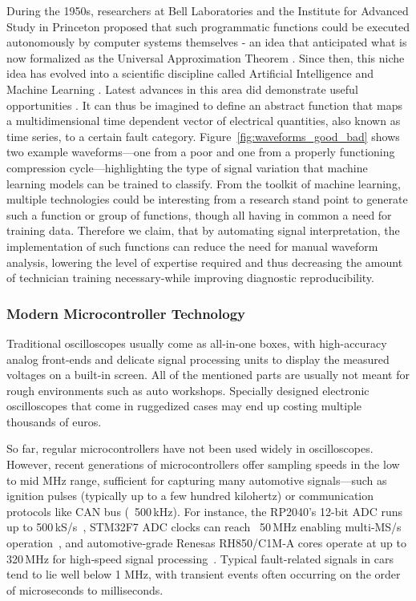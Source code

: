 During the 1950s, researchers at Bell Laboratories and the Institute for Advanced Study in Princeton proposed that such programmatic functions could be executed autonomously by computer systems themselves 
- an idea that anticipated what is now formalized as the Universal Approximation Theorem  \cite{Cybenko1989, Hornik1991}. 
Since then, this niche idea has evolved into a scientific discipline called Artificial Intelligence and Machine Learning \cite{RussellNorvig2020, Goodfellow2016}. 
Latest advances in this area did demonstrate useful opportunities \cite{LeCun2015, Silver2016}. 
It can thus be imagined to define an abstract function that maps a multidimensional time dependent vector of electrical quantities, also known as time series, to a certain fault category. 
Figure~\ref{fig:waveforms_good_bad} shows two example waveforms—one from a poor and one from a properly functioning compression cycle—highlighting the type of signal variation that machine learning models can be trained to classify.
From the toolkit of machine learning, multiple technologies could be interesting from a research stand point to generate such a function or group of functions, though all having in common a need for training data. 
Therefore we claim, that by automating signal interpretation, the implementation of such functions can reduce the need for manual waveform analysis, 
lowering the level of expertise required and thus decreasing the amount of technician training necessary-while improving diagnostic reproducibility.

\subsubsection{Modern Microcontroller Technology}
Traditional oscilloscopes usually come as all-in-one boxes, with high-accuracy analog front-ends and delicate signal processing units to display the measured voltages on a built-in screen. 
All of the mentioned parts are usually not meant for rough environments such as auto workshops. 
Specially designed electronic oscilloscopes that come in ruggedized cases may end up costing multiple thousands of euros.

So far, regular microcontrollers have not been used widely in oscilloscopes. 
However, recent generations of microcontrollers offer sampling speeds in the low to mid MHz range, 
sufficient for capturing many automotive signals—such as ignition pulses (typically up to a few hundred kilohertz) or communication protocols like CAN bus (~500 kHz). 
For instance, the RP2040’s 12-bit ADC runs up to 500 kS/s~\cite{rp2040_ds}, STM32F7 ADC clocks can reach ~50 MHz enabling multi‑MS/s operation~\cite{stm32f7_ds}, 
and automotive‑grade Renesas RH850/C1M‑A cores operate at up to 320 MHz for high‑speed signal processing~\cite{rh850_ds}. 
Typical fault-related signals in cars tend to lie well below 1 MHz, with transient events often occurring on the order of microseconds to milliseconds.

